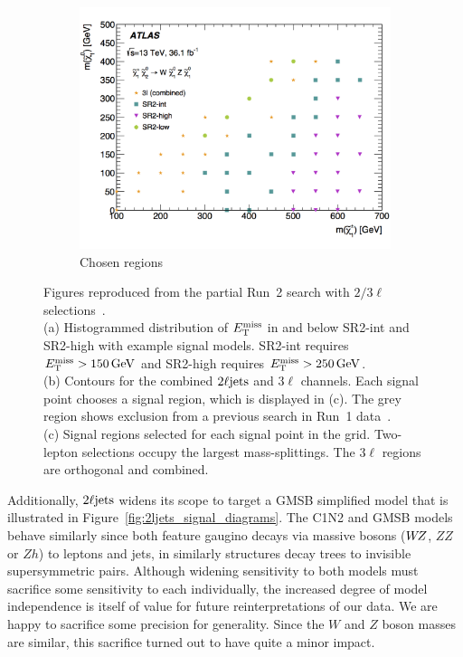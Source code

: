 \begin{figure}[tp]
\begin{subfigure}{0.46\textwidth}
\includegraphics[width=\textwidth]{figures/2ljets_23l_chosen_regions.png}
\caption{Chosen regions}
\end{subfigure}
\caption[
Figures reproduced from the partial Run~2 search with $2/3\ell$ selections
]{%
Figures reproduced from the partial Run~2 search with $2/3\ell$
selections~\cite{atlas_23l_SUSY_2016_24, hepdata.81996}.
\\[0.5em]
(a) Histogrammed distribution of $\met$ in and below SR2-int and SR2-high with
example signal models.
SR2-int requires $\met > 150\,\eV[G]$ and SR2-high requires $\met > 250\,\eV[G]$.
\\[0.5em]
(b) Contours for the combined $\twoljets$ and $3\ell$ channels.
Each signal point chooses a signal region, which is displayed in (c).
The grey region shows exclusion from a previous search in Run~1
data~\cite{atlas_2l_SUSY_2013_11}.
\\[0.5em]
(c) Signal regions selected for each signal point in the grid.
Two-lepton selections occupy the largest mass-splittings.
The $3\ell$ regions are orthogonal and combined.
}
\label{fig:2ljets_23l_stuff}
\end{figure}

Additionally, $\twoljets$ widens its scope to target a GMSB simplified model
that is illustrated in Figure~\ref{fig:2ljets_signal_diagrams}.
The C1N2 and GMSB models behave similarly since both feature gaugino decays via
massive bosons ($W\kern-0.4exZ$, $ZZ$ or $Zh$) to leptons and jets, in
similarly structures decay trees to invisible supersymmetric pairs.
Although widening sensitivity to both models must sacrifice some sensitivity to
each individually, the increased degree of model independence is itself of
value for future reinterpretations of our data.
We are happy to sacrifice some precision for generality.
Since the $W$ and $Z$ boson masses are similar, this sacrifice turned out to
have quite a minor impact.

